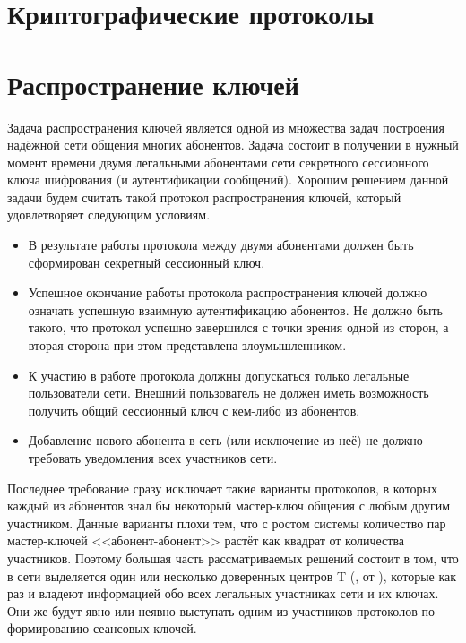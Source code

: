 \chapter{Криптографические протоколы}\label{chapter-protocols}











\chapter{Распространение ключей}\label{chapter-key-distribution-protocols}

Задача распространения ключей является одной из множества задач построения надёжной сети общения многих абонентов. Задача состоит в получении в нужный момент времени двумя легальными абонентами сети секретного сессионного ключа шифрования (и аутентификации сообщений). Хорошим решением данной задачи будем считать такой протокол распространения ключей, который удовлетворяет следующим условиям.

\begin{itemize}
	\item В результате работы протокола между двумя абонентами должен быть сформирован секретный сессионный ключ.
	\item Успешное окончание работы протокола распространения ключей должно означать успешную взаимную аутентификацию абонентов. Не должно быть такого, что протокол успешно завершился с точки зрения одной из сторон, а вторая сторона при этом представлена злоумышленником.
	\item К участию в работе протокола должны допускаться только легальные пользователи сети. Внешний пользователь не должен иметь возможность получить общий сессионный ключ с кем-либо из абонентов.
	\item Добавление нового абонента в сеть (или исключение из неё) не должно требовать уведомления всех участников сети.
\end{itemize}

Последнее требование сразу исключает такие варианты протоколов, в которых каждый из абонентов знал бы некоторый мастер-ключ общения с любым другим участником. Данные варианты плохи тем, что с ростом системы количество пар мастер-ключей <<абонент-абонент>> растёт как квадрат от количества участников. Поэтому большая часть рассматриваемых решений состоит в том, что в сети выделяется один или несколько доверенных центров T (, от ), которые как раз и владеют информацией обо всех легальных участниках сети и их ключах. Они же будут явно или неявно выступать одним из участников протоколов по формированию сеансовых ключей.

